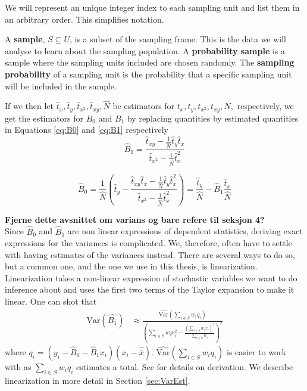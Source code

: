 \documentclass{article}
\begin{document}
We will represent an unique integer index to each sampling unit and list them in an arbitrary order. This simplifies notation.


\begin{definition} \label{def:sample}
A \textbf{sample}, \(S \subseteq U\), is a subset of the sampling frame. This is the data we will analyse to learn about the sampling population.
A \textbf{probability sample} is a sample where the sampling units included are chosen randomly.
The \textbf{sampling probability} of a sampling unit is the probability that a
specific sampling unit will be included in the sample.
\end{definition}


If we then let \(\hat{t}_x, \hat{t}_y, \hat{t}_{x^2}, \hat{t}_{xy}, \hat{N}\) be estimators
for \(t_x, t_y, t_{x^2},
t_{xy}, N,\) respectively, we get the estimators for \(B_0\) and \(B_1\) by
replacing quantities by estimated quantities in Equations \ref{eq:B0} and
\ref{eq:B1} respectively
\begin{equation*}
 \hat{B}_1 = \frac{\hat{t}_{xy} - \frac{1}{\widehat{N}} \hat{t}_y \hat{t}_x}
   {\hat{t}_{x^2} - \frac{1}{\widehat{N}} \hat{t}_x^2}
\end{equation*}

\begin{equation*}
 \hat{B}_0 = \frac{1}{\widehat{N}} \left( \hat{t}_y - \frac{\hat{t}_{xy} \hat{t}_x - \frac{1}{\widehat{N}} \hat{t}_y \hat{t}_x^2}
   {\hat{t}_{x^2} - \frac{1}{\widehat{N}} \hat{t}_x^2}
 \right)
 = \frac{\hat{t}_y}{\hat{N}} - \hat{B}_1\frac{\hat{t}_x}{\hat{N}}
\end{equation*}

\textbf{Fjerne dette avsnittet om varians og bare refere til seksjon 4?}\\
Since \(\hat{B}_0\) and \(\hat{B}_1\) are non linear expressions of dependent
statistics, deriving exact expressions for the variances is complicated. We, therefore,
often have to settle with having estimates of the variances instead.
There are several ways to do so, but a common one,
and the one we use in this thesis, is linearization. Linearization takes a
non-linear expression of stochastic variables we want to do inference about and uses
the first two terms of the Taylor expansion to make it linear.
One can shot that
\begin{align*}
 \mathrm{Var}(\hat{B_1})
 &\approx \frac{\widehat{\mathrm{Var}}\left( \sum_{i \in S} w_i q_i \right)}
   {\left( \sum_{i \in S} w_i x_i^2 - \frac{\left( \sum_{i \in S} w_i x_i \right)^2}{\sum_{i \in S} w_i} \right)^2}
\end{align*}
where \(q_i = (y_i - \hat{B}_0 - \hat{B}_1 x_i)(x_i - \hat{\bar{x}})\).
\(\widehat{\mathrm{Var}}\left( \sum_{i \in S} w_i q_i \right)\) is easier to
work with as \(\sum_{i \in S} w_i q_i\) estimates a total. See \cite[Chapter
11.2.2]{sampReg} for details on derivation. We describe linearization in more
detail in Section \ref{sec:VarEst}.
\end{document}
